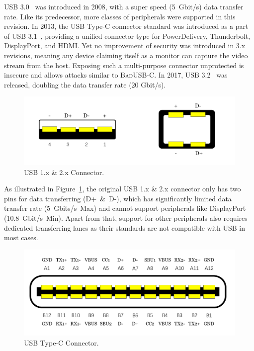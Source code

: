 \documentclass[conference]{IEEEtran}
\newcommand{\tool}{\mbox{\textsc{BadUSB-C}}\xspace}
\newcommand{\outline}[1]{}
\begin{document}
\ac{USB} 3.0~\cite{usb30} was introduced in 2008, with a super speed \mbox{(5 Gbit/s)} data
transfer rate. Like its predecessor, more classes of peripherals were supported
in this revision. In 2013, the \ac{USB} Type-C connector standard was introduced as a
part of \ac{USB} 3.1~\cite{usb31}, providing a unified connector type for
PowerDelivery, Thunderbolt, DisplayPort, and HDMI.  Yet no improvement of
security was introduced in 3.x revisions, meaning any device claiming
itself as a monitor can capture the video stream from the host. Exposing
such a multi-purpose connector unprotected is insecure and allows attacks similar to \tool. In 2017, \ac{USB} 3.2~\cite{usb32} was released, doubling the data
transfer rate (20 Gbit/s).

\begin{figure}[t]
    \centering
	\includegraphics[width=0.7\linewidth]{./Figs/usb_conn.png}
	\caption{\ac{USB} 1.x \& 2.x Connector.}
	\label{fig:usb_conn}
\end{figure}

As illustrated in Figure~\ref{fig:usb_conn}, the original \ac{USB} 1.x \& 2.x
connector only has two pins for data transferring \mbox{(D+ \& D-)}, which has
significantly limited data transfer rate \mbox{(5 Gbits/s Max)} and cannot support
peripherals like DisplayPort \mbox{(10.8 Gbit/s Min)}. Apart from that, support for
other peripherals also requires dedicated transferring lanes as their standards
are not compatible with \ac{USB} in most cases.  

\begin{figure}[t] 
	\centering
	\includegraphics[width=\linewidth]{./Figs/usb_c_conn.png} 
	\caption{\ac{USB} Type-C Connector.} 
	\label{fig:usb_c_conn} 
\end{figure}
\end{document}
